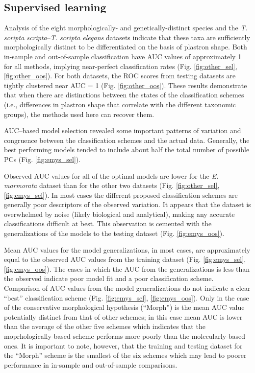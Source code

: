 \documentclass[11pt]{article}
\begin{document}
\subsection*{Supervised learning}

Analysis of the eight morphologically- and genetically-distinct species and the \textit{T. scripta scripta}--\textit{T. scripta elegans} datasets indicate that these taxa are sufficiently morphologically distinct to be differentiated on the basis of plastron shape. Both in-sample and out-of-sample classification have AUC values of approximately 1 for all methods, implying near-perfect classification rates (Fig. \ref{fig:other_sel}, \ref{fig:other_oos}). For both datasets, the ROC scores from testing datasets are tightly clustered near AUC = 1 (Fig. \ref{fig:other_oos}). These results demonstrate that when there are distinctions between the states of the classification schemes (i.e., differences in plastron shape that correlate with the different taxonomic groups), the methods used here can recover them.



AUC--based model selection revealed some important patterns of variation and congruence between the classification schemes and the actual data. Generally, the best performing models tended to include about half the total number of possible PCs (Fig. \ref{fig:emys_sel}). 

Observed AUC values for all of the optimal models are lower for the \textit{E. marmorata} dataset than for the other two datasets (Fig. \ref{fig:other_sel}, \ref{fig:emys_sel}). In most cases the different proposed classification schemes are generally poor descriptors of the observed variation. It appears that the dataset is overwhelmed by noise (likely biological and analytical), making any accurate classifications difficult at best. This observation is cemented with the generalizations of the models to the testing dataset (Fig. \ref{fig:emys_oos}).

Mean AUC values for the model generalizations, in most cases, are approximately equal to the observed AUC values from the training dataset (Fig. \ref{fig:emys_sel}, \ref{fig:emys_oos}). The  cases in which the AUC from the  generalizations is less than the observed indicate poor model fit and a poor classification scheme. Comparison of AUC values from the model generalizations do not indicate a clear ``best'' classification scheme (Fig. \ref{fig:emys_sel}, \ref{fig:emys_oos}). Only in the case of the conservative morphological hypothesis (``Morph'') is the mean AUC value potentially distinct from that of other schemes; in this case mean AUC is lower than the average of the other five schemes which indicates that the moprhologically-based scheme performs more poorly than the molecularly-based ones. It is important to note, however, that the training and testing dataset for the ``Morph'' scheme is the smallest of the six schemes which may lead to poorer performance in in-sample and out-of-sample comparisons.
\end{document}
